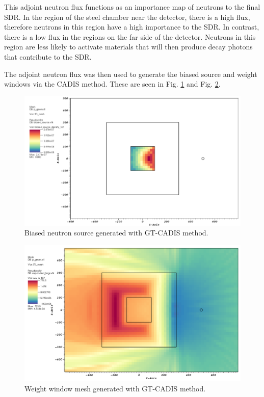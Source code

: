 This adjoint neutron flux functions as an importance map of neutrons to the
final SDR.  In the region of the steel chamber near the detector, there is a 
high flux, therefore neutrons in this region have a high importance to the SDR.
In contrast, there is a low flux in the regions on the
far side of the detector.  Neutrons in this region are less likely to activate
materials that will then produce decay photons that contribute to the
SDR.

The adjoint neutron flux was then used to generate the biased source and weight
windows via the CADIS method.  These are seen in Fig. \ref{fig:ex.biased_src} and
Fig. \ref{fig:ex.wwinp}.

\begin{figure} 
	\includegraphics[scale=0.45]{figs/biased_n_src.png}
	\caption [GT-CADIS biased neutron source] 
	{Biased neutron source generated with GT-CADIS method.\label{fig:ex.biased_src}}
\end{figure}

\begin{figure} 
	\includegraphics[scale=0.4]{figs/gtcadis_wwn.png}
	\caption [GT-CADIS weight window mesh]
	{Weight window mesh generated with GT-CADIS method.\label{fig:ex.wwinp}}
\end{figure}

